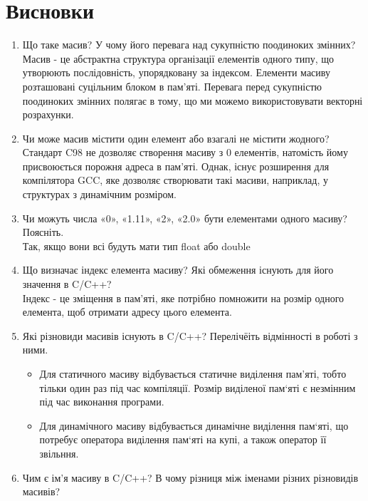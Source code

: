 \section{Висновки}
\label{sec:summary}

\begin{enumerate}
    \item Що таке масив? У чому його перевага над сукупністю поодиноких змінних? \\
          Масив - це абстрактна структура організації елементів одного типу,
          що утворюють послідовність, упорядковану за індексом.
          Елементи масиву розташовані суцільним блоком в пам’яті.
          Перевага перед сукупністю поодиноких змінних полягає в тому, що ми можемо
          використовувати векторні розрахунки.
    \item Чи може масив містити один елемент або взагалі не містити жодного? \\
          Стандарт C98 не дозволяє створення масиву з 0 елементів,
          натомість йому присвоюється порожня адреса в пам'яті.
          Однак, існує розширення для компілятора GCC,
          яке дозволяє створювати такі масиви,
          наприклад, у структурах з динамічним розміром.
    \item Чи можуть числа «0», «1.11», «2», «2.0» бути елементами одного масиву? Поясніть. \\
          Так, якщо вони всі будуть мати тип float або double
    \item Що визначає індекс елемента масиву? Які обмеження існують для його значення в C/C++? \\
          Індекс - це зміщення в пам'яті, яке потрібно помножити на розмір одного елемента,
          щоб отримати адресу цього елемента.
    \item Які різновиди масивів існують в C/C++? Перелічёіть відмінності в роботі з ними.
          \begin{itemize}
              \item Для статичного масиву відбувається статичне виділення пам’яті, тобто тільки один раз під час компіляції.
                    Розмір виділеної пам‘яті є незмінним під час виконання програми.
              \item Для динамічного масиву відбувається динамічне виділення пам‘яті,
                    що потребує оператора виділення пам‘яті на купі, а також оператор її звільння.
          \end{itemize}
    \item Чим є ім'я масиву в C/C++? В чому різниця між іменами різних різновидів масивів? \\

\end{enumerate}
